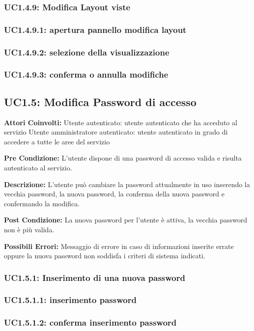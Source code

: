 \subsubsection{UC1.4.9: Modifica Layout viste }
\subsubsection{UC1.4.9.1: apertura pannello modifica layout}
\subsubsection{UC1.4.9.2: selezione della visualizzazione}
\subsubsection{UC1.4.9.3: conferma o annulla modifiche}

\subsection{UC1.5: Modifica Password di accesso}

\textbf{Attori Coinvolti:}
Utente autenticato: utente autenticato che ha acceduto al servizio
Utente amministratore autenticato: utente autenticato in grado di accedere a tutte le aree del servizio

\textbf{Pre Condizione:}
    L’utente dispone di una password di accesso valida e risulta autenticato al servizio.

\textbf{Descrizione:}
    L’utente può cambiare la password attualmente in uso inserendo la vecchia password, la nuova password, la conferma della nuova password e confermando la modifica.

\textbf{Post Condizione:}
    La nuova password per l’utente è attiva, la vecchia password non è più valida.

\textbf{Possibili Errori:}
Messaggio di errore in caso di informazioni inserite errate oppure la nuova password non soddisfa i criteri di sistema indicati.

\subsubsection{UC1.5.1: Inserimento di una nuova password}
\subsubsection{UC1.5.1.1: inserimento password}
\subsubsection{UC1.5.1.2: conferma inserimento password }
